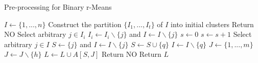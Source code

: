 \begin{algorithm}[H]
    \caption{Pre-processing for Binary r-Means}
    \label{alg:kernel}
    \begin{algorithmic}[1]
            \State $I \gets \{1,...,n\}$
            \State Construct the partition $\{I_1,...,I_t\}$ of $I$ into initial clusters
                \State Return NO
            \Else
                    
                        \State Select arbitrary $j \in I_i$
                        \State $I_i \gets I_i \backslash \{j\}$ and $I \gets I \backslash \{j\}$
                    \EndWhile
                \EndFor
                \State $s \gets 0$
                    \State $s \gets s+1$
                    \State Select arbitrary $j \in I$
                    \State $S \gets \{j\}$ and $I \gets I \backslash \{j\}$
                     
                        \State $S \gets S \cup \{q\}$
                        \State $I \gets I \backslash \{q\}$
                    \EndWhile
                    \State $J \gets \{1,...,m\}$
                        \State $J \gets J \backslash \{h\}$ 
                    \EndWhile
                    \State $L \gets L \cup A[S,J]$
                \EndWhile
            \EndIf
                \State Return NO
            \Else
                \State Return $L$
            \EndIf
        \EndProcedure
    \end{algorithmic}
\end{algorithm}